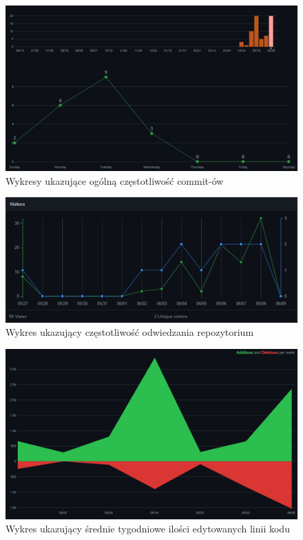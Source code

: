 \documentclass[11pt,a4paper]{report}
\begin{document}
\begin{figure}[ht!]
\centerline{\includegraphics{img/commits.png}}
\caption{Wykresy ukazujące ogólną częstotliwość commit-ów}
\end{figure}
\begin{figure}[ht!]
\centerline{\includegraphics{img/visitors.png}}
\caption{Wykres ukazujący częstotliwość odwiedzania repozytorium}
\end{figure}
\newpage
\begin{figure}[ht!]
\centerline{\includegraphics{img/code_frequency.png}}
\caption{Wykres ukazujący średnie tygodniowe ilości edytowanych linii kodu}
\end{figure}
\end{document}
